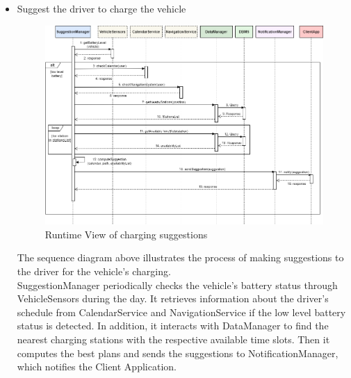 \documentclass[../main.tex]{subfiles}
\begin{document}
\begin{itemize}
    \newpage
    \item Suggest the driver to charge the vehicle
    {
    \vspace{2em}
    \begin{figure}[H]
    \centering
    \includegraphics[width=\textwidth]{runtimeview/rv_suggest.png}
    \caption{Runtime View of charging suggestions}
    \label{fig:rv_suggest}
    \end{figure}}
    The sequence diagram above illustrates the process of making suggestions to the driver for the vehicle's charging. 
    \\
    SuggestionManager periodically checks the vehicle's battery status through VehicleSensors during the day. It retrieves information about the driver's schedule from CalendarService and NavigationService if the low level battery status is detected. In addition, it interacts with DataManager to find the nearest charging stations with the respective available time slots. Then it computes the best plans and sends the suggestions to NotificationManager, which notifies the Client Application.


\end{itemize}
\end{document}
